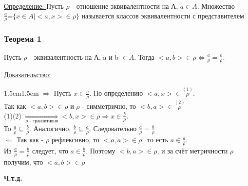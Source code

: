 \documentclass[12pt]{article}
\begin{document}
    \underline{Определение: } Пусть $\rho$ - отношение эквивалентности на А, $a \in A$. Множество \\
    $\frac{a}{\rho}$=$\{x \in A | <a,x> \in \rho\}$ называется классов эквивалентности с представителем
    \subsubsection*{Теорема 1}\label{th:1}
    \par\noindent
    Пусть $\rho$ - эквивалентность на А, a и b $\in A$. Тогда $<a,b> \in \rho \Leftrightarrow \frac{a}{\rho}=\frac{b}{\rho}.$\\
    \par\noindent
    \underline{Доказательство:}
    \begin{adjustwidth}{1.5em}{1.5em}
        $\boxed{\Rightarrow}$ Пусть $x \in \frac{a}{\rho}.$ По определению $<a,x> \in \overset{(1)}{\rho}$. \\
        Так как $<a,b>\in \rho$ и $\rho$ - симметрично, то $<b,a> \in \overset{(2)}{\rho}$\\
        (1)(2) $\underset{\rho \text{ - транзитивно}}{\Rightarrow} <b,x> \in \rho \Rightarrow x \in \frac{b}{\rho}$.\\
        То $\frac{a}{\rho} \subseteq \frac{b}{\rho}.$ Аналогично, $\frac{b}{\rho} \subseteq \frac{a}{\rho}$. 
        Следовательно $\frac{a}{\rho}=\frac{b}{\rho}$\\
        $\boxed{\Leftarrow}$ Так как - $\rho$ рефлексивно, то $<a,a> \in \rho,$ то есть $a \in \frac{a}{\rho}$.\\
        Из $\frac{a}{\rho}=\frac{b}{\rho}$ следует, что $a \in \frac{b}{\rho}.$ Поэтому $<b,a> \in \rho$, и за счёт
        метричности $\rho$ получим, что $<a,b> \in \rho$
    \end{adjustwidth}
    \begin{center}
        \textbf{Ч.т.д.}
    \end{center}
\end{document}
